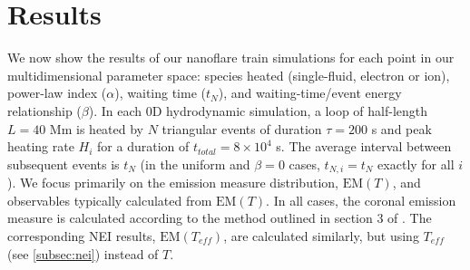 \documentclass[preprint,linenumbers]{aastex}
\begin{document}
	\section{Results}
	\label{sec:results}
	\par We now show the results of our nanoflare train simulations for each point in our multidimensional parameter space: species heated (single-fluid, electron or ion), power-law index ($\alpha$), waiting time ($t_N$), and waiting-time/event energy relationship ($\beta$). In each 0D hydrodynamic simulation, a loop of half-length $L=40$ Mm is heated by $N$ triangular events of duration $\tau=200$ s and peak heating rate $H_i$ for a duration of $t_{total}=8\times10^4$ s. The average interval between subsequent events is $t_N$ (in the uniform and $\beta=0$ cases, $t_{N,i}=t_N$ exactly for all $i$). We focus primarily on the emission measure distribution, $\mathrm{EM}(T)$, and observables typically calculated from $\mathrm{EM}(T)$. In all cases, the coronal emission measure is calculated according to the method outlined in section 3 of . The corresponding NEI results, $\mathrm{EM}(T_{eff})$, are calculated similarly, but using $T_{eff}$ (see \autoref{subsec:nei}) instead of $T$.
\end{document}
